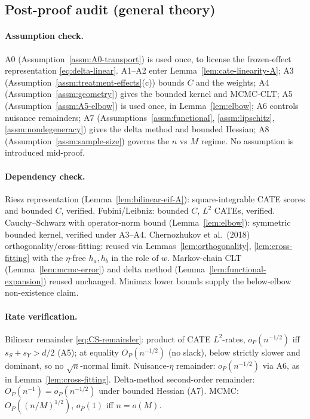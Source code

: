 \subsection{Post-proof audit (general theory)}
\label{subsec:audit-general}

\paragraph{Assumption check.}
A0 (Assumption~\ref{assm:A0-transport}) is used once, to license the frozen-effect
representation \eqref{eq:delta-linear}. A1--A2 enter Lemma~\ref{lem:cate-linearity-A}; A3
(Assumption~\ref{assm:treatment-effects}(c)) bounds $C$ and the weights; A4
(Assumption~\ref{assm:geometry}) gives the bounded kernel and MCMC-CLT; A5
(Assumption~\ref{assm:A5-elbow}) is used once, in Lemma~\ref{lem:elbow}; A6 controls nuisance
remainders; A7 (Assumptions~\ref{assm:functional}, \ref{assm:lipschitz}, \ref{assm:nondegeneracy})
gives the delta method and bounded Hessian; A8 (Assumption~\ref{assm:sample-size}) governs the $n$
vs $M$ regime. No assumption is introduced mid-proof.

\paragraph{Dependency check.}
Riesz representation (Lemma~\ref{lem:bilinear-eif-A}): square-integrable CATE scores and bounded
$C$, verified. Fubini/Leibniz: bounded $C$, $L^2$ CATEs, verified. Cauchy--Schwarz with
operator-norm bound (Lemma~\ref{lem:elbow}): symmetric bounded kernel, verified under A3--A4.
Chernozhukov et al.\ (2018) orthogonality/cross-fitting: reused via Lemmas~\ref{lem:orthogonality},
\ref{lem:cross-fitting} with the $\eta$-free $h_a,h_b$ in the role of $w$. Markov-chain CLT
(Lemma~\ref{lem:mcmc-error}) and delta method (Lemma~\ref{lem:functional-expansion}) reused
unchanged. Minimax lower bounds
\cite{BickelRitov1988,BirgeMassart1995,Robins2008HOIF,Robins2017Minimax,Kennedy2024Minimax,McClean2024DCDR}
supply the below-elbow non-existence claim.

\paragraph{Rate verification.}
Bilinear remainder \eqref{eq:CS-remainder}: product of CATE $L^2$-rates, $o_P(n^{-1/2})$ iff
$s_S+s_Y>d/2$ (A5); at equality $O_P(n^{-1/2})$ (no slack), below strictly slower and dominant, so
no $\sqrt n$-normal limit. Nuisance-$\eta$ remainder: $o_P(n^{-1/2})$ via A6, as in
Lemma~\ref{lem:cross-fitting}. Delta-method second-order remainder: $O_P(n^{-1})=o_P(n^{-1/2})$
under bounded Hessian (A7). MCMC: $O_P((n/M)^{1/2})$, $o_P(1)$ iff $n=o(M)$.

